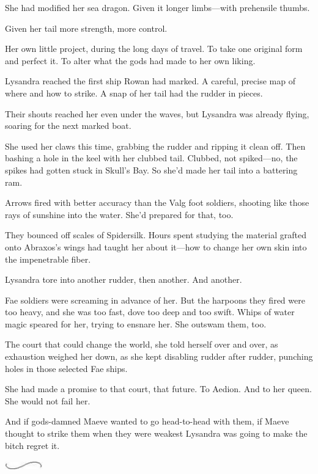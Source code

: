 She had modified her sea dragon. Given it longer limbs---with prehensile thumbs.

Given her tail more strength, more control.

Her own little project, during the long days of travel. To take one original form and perfect it. To alter what the gods had made to her own liking.

Lysandra reached the first ship Rowan had marked. A careful, precise map of where and how to strike. A snap of her tail had the rudder in pieces.

Their shouts reached her even under the waves, but Lysandra was already flying, soaring for the next marked boat.

She used her claws this time, grabbing the rudder and ripping it clean off. Then bashing a hole in the keel with her clubbed tail. Clubbed, not spiked---no, the spikes had gotten stuck in Skull's Bay. So she'd made her tail into a battering ram.

Arrows fired with better accuracy than the Valg foot soldiers, shooting like those rays of sunshine into the water. She'd prepared for that, too.

They bounced off scales of Spidersilk. Hours spent studying the material grafted onto Abraxos's wings had taught her about it---how to change her own skin into the impenetrable fiber.

Lysandra tore into another rudder, then another. And another.

Fae soldiers were screaming in advance of her. But the harpoons they fired were too heavy, and she was too fast, dove too deep and too swift. Whips of water magic speared for her, trying to ensnare her. She outswam them, too.

The court that could change the world, she told herself over and over, as exhaustion weighed her down, as she kept disabling rudder after rudder, punching holes in those selected Fae ships.

She had made a promise to that court, that future. To Aedion. And to her queen. She would not fail her.

And if gods-damned Maeve wanted to go head-to-head with them, if Maeve thought to strike them when they were weakest  Lysandra was going to make the bitch regret it.

\includegraphics[width=0.65in,height=0.13in]{images/seperator}

